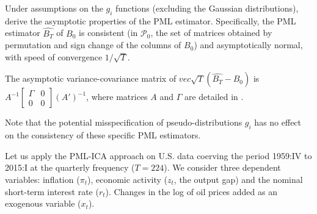 \documentclass[
  12pt,
]{book}
\newenvironment{Shaded}{\begin{snugshade}}{\end{snugshade}}
\newcommand{\DecValTok}[1]{\textcolor[rgb]{0.00,0.00,0.81}{#1}}
\newcommand{\FunctionTok}[1]{\textcolor[rgb]{0.00,0.00,0.00}{#1}}
\newcommand{\NormalTok}[1]{#1}
\newcommand{\OtherTok}[1]{\textcolor[rgb]{0.56,0.35,0.01}{#1}}
\newcommand{\SpecialCharTok}[1]{\textcolor[rgb]{0.00,0.00,0.00}{#1}}
\newcommand{\StringTok}[1]{\textcolor[rgb]{0.31,0.60,0.02}{#1}}
\theoremstyle{definition}
\theoremstyle{definition}
\theoremstyle{definition}
\theoremstyle{definition}
\theoremstyle{remark}
\begin{document}
Under assumptions on the \(g_i\) functions (excluding the Gaussian distributions), \citet{Gourieroux_Monfort_Renne_2017} derive the asymptotic properties of the PML estimator. Specifically, the PML estimator \(\widehat{B_T}\) of \(B_0\) is consistent (in \(\mathcal{P}_0\), the set of matrices obtained by permutation and sign change of the columns of \(B_0\)) and asymptotically normal, with speed of convergence \(1/\sqrt{T}\).

The asymptotic variance-covariance matrix of \(vec \sqrt{T} (\widehat{B_T} - B_0)\) is \(A^{-1} \left[\begin{array}{cc} \Gamma & 0 \\ 0 & 0 \end{array} \right] (A')^{-1}\), where matrices \(A\) and \(\Gamma\) are detailed in \citet{Gourieroux_Monfort_Renne_2017}.

Note that the potential misspecification of pseudo-distributions \(g_i\) has no effect on the consistency of these specific PML estimators.

Let us apply the PML-ICA approach on U.S. data coerving the period 1959:IV to 2015:I at the quarterly frequency (\(T=224\)). We consider three dependent variables: inflation (\(\pi_t\)), economic activity (\(z_t\), the output gap) and the nominal short-term interest rate (\(r_t\)). Changes in the log of oil prices added as an exogenous variable (\(x_t\)).

\begin{Shaded}
\end{Shaded}
\end{document}
